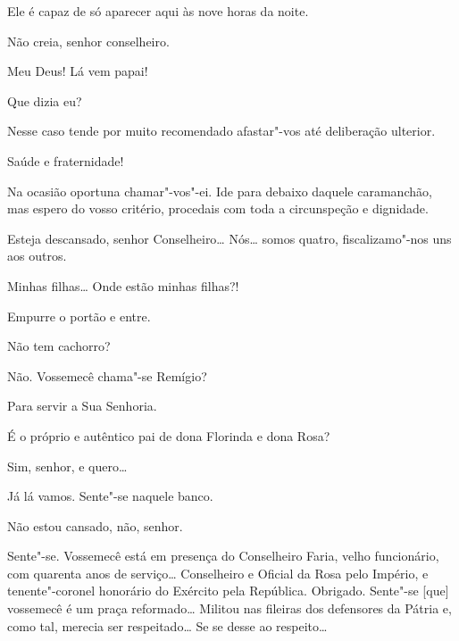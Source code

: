  Ele é capaz de só aparecer aqui às nove horas da noite.

 Não creia, senhor conselheiro.

  Meu Deus! Lá vem papai!

 Que dizia eu?

 Nesse caso tende por muito recomendado afastar"-vos até deliberação
ulterior.

  Saúde e fraternidade!

 Na ocasião oportuna chamar"-vos"-ei. Ide para debaixo daquele
caramanchão, mas espero do vosso critério, procedais com toda a circunspeção e
dignidade.

 Esteja descansado, senhor Conselheiro\ldots{} Nós\ldots{} somos quatro,
fiscalizamo"-nos uns aos outros. 




  Minhas filhas\ldots{} Onde estão minhas filhas?!

 Empurre o portão e entre.

 Não tem cachorro?

 Não.  Vossemecê chama"-se Remígio?

 Para servir a Sua Senhoria.

 É o próprio e autêntico pai de dona Florinda e dona
Rosa?

 Sim, senhor, e quero\ldots{}

 Já lá vamos. Sente"-se naquele banco.

 Não estou cansado, não, senhor.

 Sente"-se.   Vossemecê está em
presença do Conselheiro Faria, velho funcionário, com quarenta anos de
serviço\ldots{} Conselheiro e Oficial da Rosa pelo Império, e tenente"-coronel
honorário do Exército pela República.   Obrigado. Sente"-se [que] vossemecê é um praça
reformado\ldots{} Militou nas fileiras dos defensores da Pátria e, como tal, merecia
ser respeitado\ldots{} Se se desse ao respeito\ldots{}

